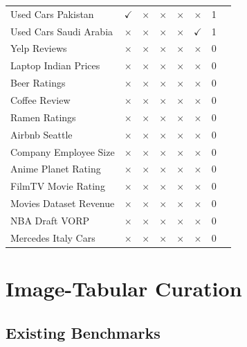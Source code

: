 \documentclass{llmxive}
\begin{document}
\begin{longtable}{llcccccr}
Used Cars Pakistan  & $\checkmark$ & $\times$     & $\times$     & $\times$     & $\times$     & 1 \\
Used Cars Saudi Arabia   & $\times$     & $\times$     & $\times$     & $\times$     & $\checkmark$ & 1 \\
Yelp Reviews    & $\times$     & $\times$     & $\times$     & $\times$     & $\times$     & 0 \\
Laptop Indian Prices   & $\times$     & $\times$     & $\times$     & $\times$     & $\times$     & 0 \\
Beer Ratings   & $\times$     & $\times$     & $\times$     & $\times$     & $\times$     & 0 \\
Coffee Review   & $\times$     & $\times$     & $\times$     & $\times$     & $\times$     & 0 \\
Ramen Ratings   & $\times$     & $\times$     & $\times$     & $\times$     & $\times$     & 0 \\
Airbnb Seattle   & $\times$     & $\times$     & $\times$     & $\times$     & $\times$     & 0 \\
Company Employee Size    & $\times$     & $\times$     & $\times$     & $\times$     & $\times$     & 0 \\
Anime Planet Rating   & $\times$     & $\times$     & $\times$     & $\times$     & $\times$     & 0 \\
FilmTV Movie Rating   & $\times$     & $\times$     & $\times$     & $\times$     & $\times$     & 0 \\
Movies Dataset Revenue    & $\times$     & $\times$     & $\times$     & $\times$     & $\times$     & 0 \\
NBA Draft VORP   & $\times$     & $\times$     & $\times$     & $\times$     & $\times$     & 0 \\
Mercedes Italy Cars   & $\times$     & $\times$     & $\times$     & $\times$     & $\times$     & 0 \\
\end{longtable}

\section{Image-Tabular Curation}
\label{app:image_curation}

\subsection{Existing Benchmarks}
\end{document}
